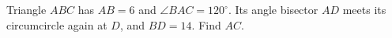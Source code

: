 Triangle $ABC$ has $AB=6$ and $\angle BAC=120^\circ$. Its angle bisector $AD$ meets its circumcircle again at $D$, and $BD=14$. Find $AC$.
